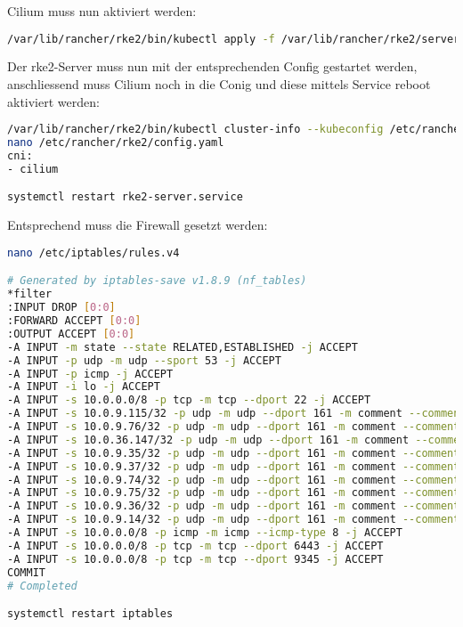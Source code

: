 Cilium muss nun aktiviert werden:
\begin{lstlisting}[language=bash, caption=rke2 server cilium aktivieren,captionpos=b,label={lst:rke2-server-cilium-apply},breaklines=true]
/var/lib/rancher/rke2/bin/kubectl apply -f /var/lib/rancher/rke2/server/manifests/rke2-cilium-config.yaml
\end{lstlisting}

Der rke2-Server muss nun mit der entsprechenden Config gestartet werden, anschliessend muss Cilium noch in die Conig und diese mittels Service reboot aktiviert werden:
\lstset{style=gra_codestyle}
\begin{lstlisting}[language=bash, caption=rke2 server starten,captionpos=b,label={lst:rke2-server-start},breaklines=true]
/var/lib/rancher/rke2/bin/kubectl cluster-info --kubeconfig /etc/rancher/rke2/rke2.yaml
nano /etc/rancher/rke2/config.yaml
cni:
- cilium

systemctl restart rke2-server.service
\end{lstlisting}

Entsprechend muss die Firewall gesetzt werden:
\lstset{style=gra_codestyle}
\begin{lstlisting}[language=bash, caption=iptables entries server,captionpos=b,label={lst:iptables-server-entries},breaklines=true]
nano /etc/iptables/rules.v4

# Generated by iptables-save v1.8.9 (nf_tables)
*filter
:INPUT DROP [0:0]
:FORWARD ACCEPT [0:0]
:OUTPUT ACCEPT [0:0]
-A INPUT -m state --state RELATED,ESTABLISHED -j ACCEPT
-A INPUT -p udp -m udp --sport 53 -j ACCEPT
-A INPUT -p icmp -j ACCEPT
-A INPUT -i lo -j ACCEPT
-A INPUT -s 10.0.0.0/8 -p tcp -m tcp --dport 22 -j ACCEPT
-A INPUT -s 10.0.9.115/32 -p udp -m udp --dport 161 -m comment --comment "Allow SNMP for probe 10.0.9.115" -j ACCEPT
-A INPUT -s 10.0.9.76/32 -p udp -m udp --dport 161 -m comment --comment "Allow SNMP for probe 10.0.9.76" -j ACCEPT
-A INPUT -s 10.0.36.147/32 -p udp -m udp --dport 161 -m comment --comment "Allow SNMP for probe 10.0.36.147" -j ACCEPT
-A INPUT -s 10.0.9.35/32 -p udp -m udp --dport 161 -m comment --comment "Allow SNMP for probe 10.0.9.35" -j ACCEPT
-A INPUT -s 10.0.9.37/32 -p udp -m udp --dport 161 -m comment --comment "Allow SNMP for probe 10.0.9.37" -j ACCEPT
-A INPUT -s 10.0.9.74/32 -p udp -m udp --dport 161 -m comment --comment "Allow SNMP for probe 10.0.9.74" -j ACCEPT
-A INPUT -s 10.0.9.75/32 -p udp -m udp --dport 161 -m comment --comment "Allow SNMP for probe 10.0.9.75" -j ACCEPT
-A INPUT -s 10.0.9.36/32 -p udp -m udp --dport 161 -m comment --comment "Allow SNMP for probe 10.0.9.36" -j ACCEPT
-A INPUT -s 10.0.9.14/32 -p udp -m udp --dport 161 -m comment --comment "Allow SNMP for probe 10.0.9.14" -j ACCEPT
-A INPUT -s 10.0.0.0/8 -p icmp -m icmp --icmp-type 8 -j ACCEPT
-A INPUT -s 10.0.0.0/8 -p tcp -m tcp --dport 6443 -j ACCEPT
-A INPUT -s 10.0.0.0/8 -p tcp -m tcp --dport 9345 -j ACCEPT
COMMIT
# Completed

systemctl restart iptables
\end{lstlisting}

